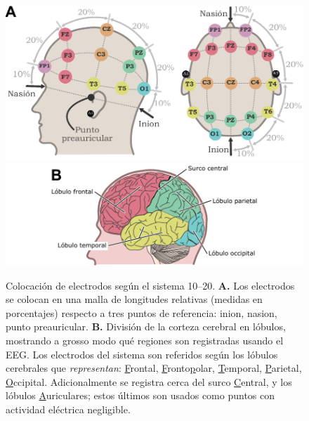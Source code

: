 \documentclass[12pt,letterpaper]{book}
\begin{document}
\begin{figure}
\centering
\includegraphics[width=\linewidth]{./img_diagramas/cabeza_proporcionada_color_v4.pdf} 
\includegraphics[width=\linewidth]{./img_diagramas/cerebro_1020_v5.pdf} 
\caption[Colocación de electrodos según el sistema 10--20]{Colocación de electrodos según el sistema 10--20. \textbf{A.} Los electrodos se colocan en una malla de longitudes relativas (medidas en porcentajes) respecto a tres puntos de referencia: inion, nasion, punto preauricular.
\textbf{B.} División de la corteza cerebral en lóbulos, mostrando a grosso modo qué regiones son registradas usando el EEG. Los electrodos del sistema son referidos según los lóbulos cerebrales que \textit{representan}: \underline{F}rontal, \underline{F}ronto\underline{p}olar, \underline{T}emporal, \underline{P}arietal, \underline{O}ccipital. Adicionalmente se registra cerca del surco \underline{C}entral, y los lóbulos \underline{A}uriculares; estos últimos son usados como puntos con actividad eléctrica negligible.
}
\label{img1020}
\end{figure}
\end{document}
